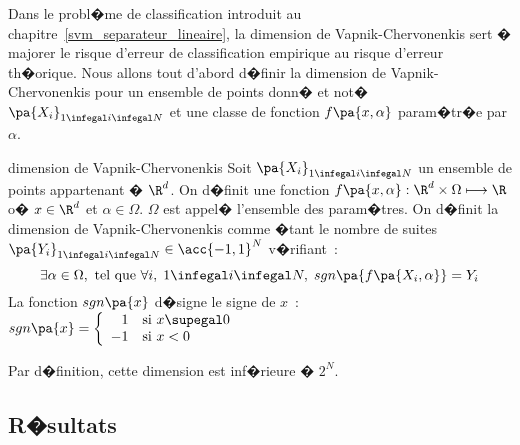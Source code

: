 


Dans le probl�me de classification introduit au chapitre~\ref{svm_separateur_lineaire}, la dimension de Vapnik-Chervonenkis sert � majorer le risque d'erreur de classification empirique au risque d'erreur th�orique. Nous allons tout d'abord d�finir la dimension de Vapnik-Chervonenkis pour un ensemble de points donn� et not� $\pa{X_i}_{1 \infegal i \infegal N}$ et une classe de fonction $f\pa{x,\alpha}$ param�tr�e par $\alpha$.



            \begin{xdefinition}{dimension de Vapnik-Chervonenkis}
            Soit $\pa{X_i}_{1 \infegal i \infegal N}$ un ensemble de points appartenant � $\R^d$. On d�finit une 
            fonction $f\pa{x,\alpha} : \R^d \times \Omega \longmapsto  \R$ 
            o� $x \in \R^d$ et $\alpha \in \Omega$.
            $\Omega$ est appel� l'ensemble des param�tres.
            On d�finit la dimension de Vapnik-Chervonenkis comme �tant le nombre de suites 
            $\pa{Y_i}_{1 \infegal i \infegal N} \in \acc{-1,1}^N$ v�rifiant~:
                    $$
                    \exists \alpha \in \Omega, \text{ tel que } \forall i, \; 1 \infegal i \infegal N, \;
                            sgn\pa{ f\pa{X_i,\alpha} } = Y_i
                    $$
            La fonction $sgn\pa{x}$ d�signe le signe de $x$~: $sgn\pa{x} = \left\{ \begin{array}{rl}
                                                                                                                         1 & \text{si } x \supegal 0 \\
                                                                                                                        -1 & \text{si } x < 0 
                                                                                                                        \end{array} \right. $
                                                                                                                        
            Par d�finition, cette dimension est inf�rieure � $2^N$.
            \end{xdefinition}





\subsection{R�sultats}
\label{svm_dimension_vc_lin}


